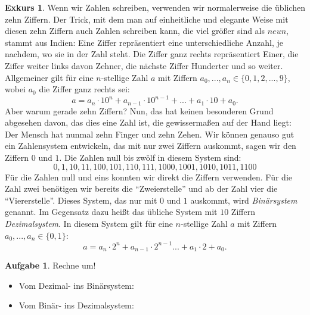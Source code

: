 \documentclass[a4paper,ngerman,12pt]{scrartcl}
\theoremstyle{definition}
\newtheorem*{aufg}{Aufgabe}
\newtheorem*{exk}{Exkurs}
\newenvironment{exkurs}{\begin{shaded}\begin{exk}}{\end{exk}\end{shaded}}
\begin{document}
\begin{exkurs}
  Wenn wir Zahlen schreiben, verwenden wir normalerweise die üblichen zehn Ziffern. Der Trick, mit dem man auf einheitliche und elegante Weise mit diesen zehn Ziffern auch Zahlen schreiben kann, die viel größer sind als $neun$, stammt aus Indien: Eine Ziffer repräsentiert eine unterschiedliche Anzahl, je nachdem, wo sie in der Zahl steht. Die Ziffer ganz rechts repräsentiert Einer, die Ziffer weiter links davon Zehner, die nächste Ziffer Hunderter und so weiter. Allgemeiner gilt für eine $n$-stellige Zahl $a$ mit Ziffern $a_0, ..., a_n \in \{ 0, 1, 2, ..., 9 \}$, wobei $a_0$ die Ziffer ganz rechts sei:
  \[ a = a_n \cdot 10^n + a_{n-1} \cdot 10^{n-1} + ... + a_1 \cdot 10 + a_0. \]
  Aber warum gerade zehn Ziffern? Nun, das hat keinen besonderen Grund abgesehen davon, das dies eine Zahl ist, die gewissermaßen auf der Hand liegt: Der Mensch hat nunmal zehn Finger und zehn Zehen. Wir können genauso gut ein Zahlensystem entwickeln, das mit nur zwei Ziffern auskommt, sagen wir den Ziffern $0$ und $1$. Die Zahlen null bis zwölf in diesem System sind:
  \[ 0, 1, 10, 11, 100, 101, 110, 111, 1000, 1001, 1010, 1011, 1100 \]
  Für die Zahlen null und eins konnten wir direkt die Ziffern verwenden. Für die Zahl zwei benötigen wir bereits die "`Zweierstelle"' und ab der Zahl vier die "`Viererstelle"'. Dieses System, das nur mit $0$ und $1$ auskommt, wird \emph{Binärsystem} genannt. Im Gegensatz dazu heißt das übliche System mit $10$ Ziffern \emph{Dezimalsystem}. In diesem System gilt für eine $n$-stellige Zahl $a$ mit Ziffern $a_0, ..., a_n \in \{ 0, 1 \}$:
  \[ a = a_n \cdot 2^n + a_{n-1} \cdot 2^{n-1} ... + a_1 \cdot 2 + a_0. \]
\end{exkurs}

\begin{aufg}
  Rechne um!
  \begin{itemize}
    \item Vom Dezimal- ins Binärsystem:
    \item Vom Binär- ins Dezimalsystem:
  \end{itemize}
\end{aufg}
\end{document}
